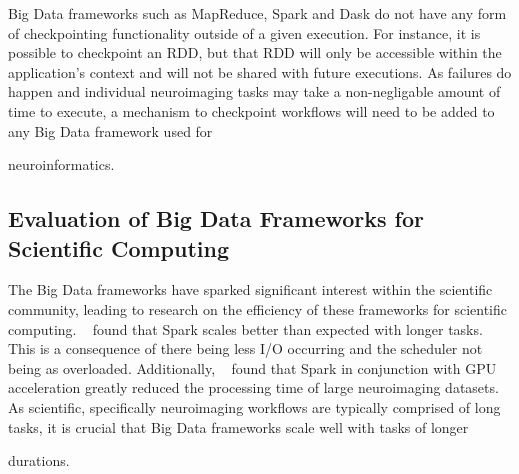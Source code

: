             Big Data frameworks such as MapReduce, Spark and Dask do not have   
            any form of checkpointing functionality outside of a given          
            execution. For instance, it is possible to checkpoint an RDD, but   
            that RDD will only be accessible within the application's context   
            and will not be shared with future executions. As failures do       
            happen and individual neuroimaging tasks may take a non-negligable  
            amount of time to execute, a mechanism to checkpoint workflows      
            will need to be added to any Big Data framework used for
            
            neuroinformatics.                                                   

                                                                                
        \subsection{Evaluation of Big Data Frameworks for Scientific
        Computing}\label{eval}     
            The Big Data frameworks have sparked significant interest within the
            scientific community, leading to research on the efficiency of      
            these frameworks for scientific computing. ~\cite{souza2017spark}
            found  
            that Spark scales better than expected with longer tasks. This is   
            a consequence of there being less I/O occurring and the scheduler
            not being as overloaded. Additionally, ~\cite{boubela2016big} found
            that Spark in conjunction with  
            GPU acceleration greatly reduced the processing time of large       
            neuroimaging datasets.                                              
            As scientific, specifically neuroimaging workflows are typically    
            comprised of long tasks, it                                         
            is crucial that Big Data frameworks scale well with tasks of longer
            
            durations.
    
